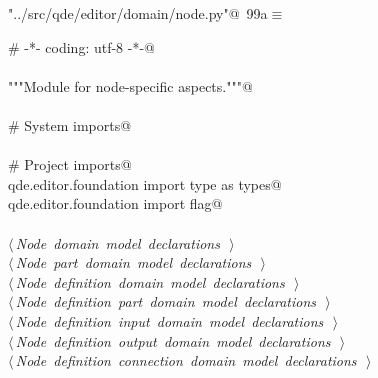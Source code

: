 \documentclass[
    a4paper,      %
    10pt,         %
    openright,    %
    notitlepage,  %
    parskip=half, %
]{scrreprt}       %
\theoremstyle{definition}                    %
\begin{document}
\begin{flushleft} \small
\begin{minipage}{\linewidth}\label{scrap159}\raggedright\small
{} \verb@"../src/qde/editor/domain/node.py"@\nobreak\ {\footnotesize {99a}}$\equiv$
\vspace{-1ex}
\begin{list}{}{} \item
\mbox{}\lstinline@# -*- coding: utf-8 -*-@\\
\mbox{}\lstinline@@\\
\mbox{}\lstinline@"""Module for node-specific aspects."""@\\
\mbox{}\lstinline@@\\
\mbox{}\lstinline@# System imports@\\
\mbox{}\lstinline@@\\
\mbox{}\lstinline@# Project imports@\\
\mbox{}\lstinline@from qde.editor.foundation import type as types@\\
\mbox{}\lstinline@from qde.editor.foundation import flag@\\
\mbox{}\lstinline@@\\
\mbox{}\lstinline@@\hbox{$\langle\,${\itshape Node domain model declarations}\nobreak\ {\footnotesize {}}$\,\rangle$}\lstinline@@\\
\mbox{}\lstinline@@\hbox{$\langle\,${\itshape Node part domain model declarations}\nobreak\ {\footnotesize {}}$\,\rangle$}\lstinline@@\\
\mbox{}\lstinline@@\hbox{$\langle\,${\itshape Node definition domain model declarations}\nobreak\ {\footnotesize {}}$\,\rangle$}\lstinline@@\\
\mbox{}\lstinline@@\hbox{$\langle\,${\itshape Node definition part domain model declarations}\nobreak\ {\footnotesize {}}$\,\rangle$}\lstinline@@\\
\mbox{}\lstinline@@\hbox{$\langle\,${\itshape Node definition input domain model declarations}\nobreak\ {\footnotesize {}}$\,\rangle$}\lstinline@@\\
\mbox{}\lstinline@@\hbox{$\langle\,${\itshape Node definition output domain model declarations}\nobreak\ {\footnotesize {}}$\,\rangle$}\lstinline@@\\
\mbox{}\lstinline@@\hbox{$\langle\,${\itshape Node definition connection domain model declarations}\nobreak\ {\footnotesize {}}$\,\rangle$}\lstinline@@\\

\end{list}
\end{minipage}
\end{flushleft}
\end{document}
